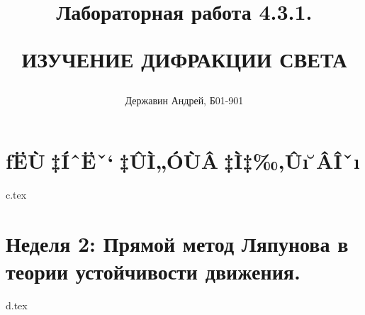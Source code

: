\documentclass[12pt,a4paper,fleqn]{article}
\title
{
	\hfill \break	\hfill \break
	\hfill \break	\hfill \break
	Лабораторная работа 4.3.1.
	
	ИЗУЧЕНИЕ ДИФРАКЦИИ СВЕТА
}
\author{Державин Андрей, Б01-901}
\date{}
\begin{document}
\maketitle
\thispagestyle{empty} %
\newpage
\tableofcontents
\newpage

\section{ƒËÙ‡ÍˆËˇ‘‡ÛÌ„ÓÙÂ‡Ì‡‰‚Ûı ̆ÂÎˇı}
{c.tex}

\section{Неделя 2: Прямой метод Ляпунова в теории устойчивости движения.}
{d.tex}
\end{document}

